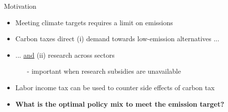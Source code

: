 \documentclass[11pt,aspectratio=169]{beamer}
\newcommand{\ar}{$\Rightarrow$ \ }
\begin{document}
\begin{frame}{Motivation}
	
	\begin{itemize}[<+-| alert@+>]
		\item Meeting climate targets requires a limit on emissions \citep{IPCC2022}
		\vspace{3mm}
		\item Carbon taxes  direct  (i) demand towards low-emission alternatives ...
		\vspace{3mm}
		\item ... \underline{and} (ii) research across sectors
		\vspace{2mm}
		\begin{itemize}
			\item[-] important when research subsidies are unavailable \small{\citep{Acemoglu2012TheChange}}	
		\end{itemize}
		\vspace{2mm}
		\item Labor income tax can be used to counter side effects of carbon tax 
		
		\vspace{3mm}
		\item \textbf{What is the optimal policy mix to meet the emission target?}
	\end{itemize}
\end{frame}
\end{document}
